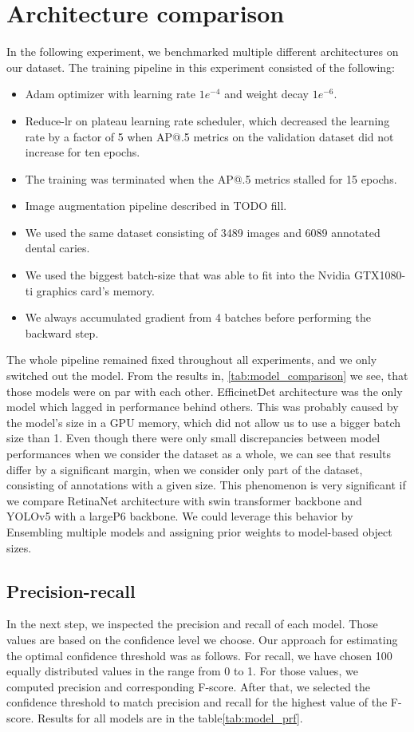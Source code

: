 \section{Architecture comparison}
In the following experiment, we benchmarked multiple different architectures on our dataset. The training pipeline in this experiment consisted of the following:
\begin{itemize}
    \item  Adam optimizer with learning rate $1e^{-4}$ and weight decay $1e^{-6}$.
    \item Reduce-lr on plateau learning rate scheduler, which decreased the learning rate by a factor of 5 when AP@.5 metrics on the validation dataset did not increase for ten epochs.
    \item The training was terminated when the AP@.5 metrics stalled for 15 epochs.
    \item Image augmentation pipeline described in TODO fill.
    \item We used the same dataset consisting of 3489 images and 6089 annotated dental caries.
    \item We used the biggest batch-size that was able to fit into the Nvidia GTX1080-ti graphics card's memory.
    \item We always accumulated gradient from 4 batches before performing the backward step.
\end{itemize}
The whole pipeline remained fixed throughout all experiments, and we only switched out the model. From the results in, \ref{tab:model_comparison} we see, that those models were on par with each other. EfficinetDet architecture was the only model which lagged in performance behind others. This was probably caused by the model's size in a GPU memory, which did not allow us to use a bigger batch size than 1. Even though there were only small discrepancies between model performances when we consider the dataset as a whole, we can see that results differ by a significant margin, when we consider only part of the dataset, consisting of annotations with a given size. This phenomenon is very significant if we compare RetinaNet architecture with swin transformer backbone and YOLOv5 with a largeP6 backbone. We could leverage this behavior by Ensembling multiple models and assigning prior weights to model-based object sizes.
\subsection{Precision-recall}
In the next step, we inspected the precision and recall of each model. Those values are based on the confidence level we choose. Our approach for estimating the optimal confidence threshold was as follows. For recall, we have chosen 100 equally distributed values in the range from 0 to 1. For those values, we computed precision and corresponding F-score. After that, we selected the confidence threshold to match precision and recall for the highest value of the F-score. Results for all models are in the table\ref{tab:model_prf}.

